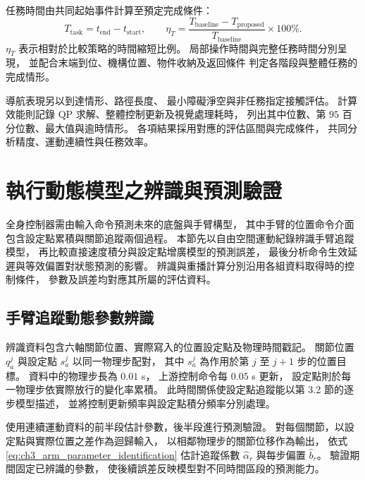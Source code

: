 任務時間由共同起始事件計算至預定完成條件：
\begin{equation}
    T_{\mathrm{task}}=t_{\mathrm{end}}-t_{\mathrm{start}},
    \qquad
    \eta_T=
    \frac{T_{\mathrm{baseline}}-T_{\mathrm{proposed}}}
         {T_{\mathrm{baseline}}}\times100\%.
    \label{eq:ch4_task_time_comparison}
\end{equation}
$\eta_T$ 表示相對於比較策略的時間縮短比例。
局部操作時間與完整任務時間分別呈現，
並配合末端到位、機構位置、物件收納及返回條件
判定各階段與整體任務的完成情形。

導航表現另以到達情形、路徑長度、
最小障礙淨空與非任務指定接觸評估。
計算效能則記錄 QP 求解、整體控制更新及視覺處理耗時，
列出其中位數、第 $95$ 百分位數、最大值與逾時情形。
各項結果採用對應的評估區間與完成條件，
共同分析精度、運動連續性與任務效率。

\section{執行動態模型之辨識與預測驗證}
\label{sec:execution_model_validation}

全身控制器需由輸入命令預測未來的底盤與手臂構型，
其中手臂的位置命令介面包含設定點累積與關節追蹤兩個過程。
本節先以自由空間運動紀錄辨識手臂追蹤模型，
再比較直接速度積分與設定點增廣模型的預測誤差，
最後分析命令生效延遲與等效偏置對狀態預測的影響。
辨識與重播計算分別沿用各組資料取得時的控制條件，
參數及誤差均對應其所屬的評估資料。

\subsection{手臂追蹤動態參數辨識}
\label{subsec:arm_tracking_parameter_identification}

辨識資料包含六軸關節位置、實際寫入的位置設定點及物理時間戳記。
關節位置 $q_a^j$ 與設定點 $s_a^j$ 以同一物理步配對，
其中 $s_a^j$ 為作用於第 $j$ 至 $j+1$ 步的位置目標。
資料中的物理步長為 $0.01$ s，
上游控制命令每 $0.05$ s 更新，
設定點則於每一物理步依實際放行的變化率累積。
此時間關係使設定點追蹤能以第 3.2 節的逐步模型描述，
並將控制更新頻率與設定點積分頻率分別處理。

使用連續運動資料的前半段估計參數，後半段進行預測驗證。
對每個關節，以設定點與實際位置之差作為迴歸輸入，
以相鄰物理步的關節位移作為輸出，
依式\eqref{eq:ch3_arm_parameter_identification}
估計追蹤係數 $\hat\alpha_r$ 與每步偏置 $\hat b_r$。
驗證期間固定已辨識的參數，
使後續誤差反映模型對不同時間區段的預測能力。

